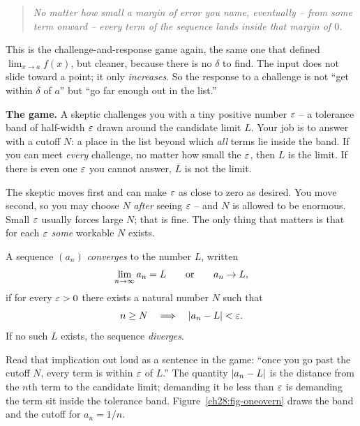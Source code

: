 \begin{quote}
\emph{No matter how small a margin of error you name, eventually -- from some
term onward -- every term of the sequence lands inside that margin of $0$.}
\end{quote}

This is the challenge-and-response game again, the same one that defined
$\lim_{x\to a} f(x)$, but cleaner, because there is no $\delta$ to find. The
input does not slide toward a point; it only \emph{increases}. So the response
to a challenge is not ``get within $\delta$ of $a$'' but ``go far enough
out in the list.''

\begin{intuitionbox}
\textbf{The game.} A skeptic challenges you with a tiny positive number
$\varepsilon$ -- a tolerance band of half-width $\varepsilon$ drawn around the candidate
limit $L$. Your job is to answer with a cutoff $N$: a place in the list beyond
which \emph{all} terms lie inside the band. If you can meet \emph{every}
challenge, no matter how small the $\varepsilon$, then $L$ is the limit. If there is
even one $\varepsilon$ you cannot answer, $L$ is not the limit.

The skeptic moves first and can make $\varepsilon$ as close to zero as desired. You
move second, so you may choose $N$ \emph{after} seeing $\varepsilon$ -- and $N$ is
allowed to be enormous. Small $\varepsilon$ usually forces large $N$; that is fine. The
only thing that matters is that for each $\varepsilon$ \emph{some} workable $N$ exists.
\end{intuitionbox}

\begin{definition}
\label{ch28:def-limit}
A sequence $(a_n)$ \emph{converges} to the number $L$, written
\[
  \lim_{n\to\infty} a_n = L
  \qquad\text{or}\qquad
  a_n \to L,
\]
if for every $\varepsilon > 0$ there exists a natural number $N$ such that
\[
  n \ge N \quad\Longrightarrow\quad \lvert a_n - L\rvert < \varepsilon .
\]
If no such $L$ exists, the sequence \emph{diverges}.
\end{definition}

Read that implication out loud as a sentence in the game: ``once you go past the
cutoff $N$, every term is within $\varepsilon$ of $L$.'' The quantity $\lvert a_n - L\rvert$ is
the distance from the $n$th term to the candidate limit; demanding it be less
than $\varepsilon$ is demanding the term sit inside the tolerance band.
Figure~\ref{ch28:fig-oneovern} draws the band and the cutoff for $a_n = 1/n$.

